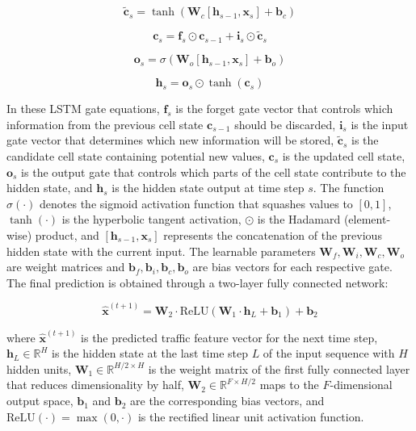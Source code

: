 \documentclass[journal]{IEEEtran}
\begin{document}
\begin{equation}
\tilde{\mathbf{c}}_s = \tanh(\mathbf{W}_c [\mathbf{h}_{s-1}, \mathbf{x}_s] + \mathbf{b}_c)
\label{eq:candidate}
\end{equation}

\begin{equation}
\mathbf{c}_s = \mathbf{f}_s \odot \mathbf{c}_{s-1} + \mathbf{i}_s \odot \tilde{\mathbf{c}}_s
\label{eq:cell_state}
\end{equation}

\begin{equation}
\mathbf{o}_s = \sigma(\mathbf{W}_o [\mathbf{h}_{s-1}, \mathbf{x}_s] + \mathbf{b}_o)
\label{eq:output_gate}
\end{equation}

\begin{equation}
\mathbf{h}_s = \mathbf{o}_s \odot \tanh(\mathbf{c}_s)
\label{eq:hidden_state}
\end{equation}

\noindent In these LSTM gate equations, $\mathbf{f}_s$ is the forget gate vector that controls which information from the previous cell state $\mathbf{c}_{s-1}$ should be discarded, $\mathbf{i}_s$ is the input gate vector that determines which new information will be stored, $\tilde{\mathbf{c}}_s$ is the candidate cell state containing potential new values, $\mathbf{c}_s$ is the updated cell state, $\mathbf{o}_s$ is the output gate that controls which parts of the cell state contribute to the hidden state, and $\mathbf{h}_s$ is the hidden state output at time step $s$. The function $\sigma(\cdot)$ denotes the sigmoid activation function that squashes values to $[0,1]$, $\tanh(\cdot)$ is the hyperbolic tangent activation, $\odot$ is the Hadamard (element-wise) product, and $[\mathbf{h}_{s-1}, \mathbf{x}_s]$ represents the concatenation of the previous hidden state with the current input. The learnable parameters $\mathbf{W}_f, \mathbf{W}_i, \mathbf{W}_c, \mathbf{W}_o$ are weight matrices and $\mathbf{b}_f, \mathbf{b}_i, \mathbf{b}_c, \mathbf{b}_o$ are bias vectors for each respective gate. The final prediction is obtained through a two-layer fully connected network:

\begin{equation}
\hat{\mathbf{x}}^{(t+1)} = \mathbf{W}_2 \cdot \text{ReLU}(\mathbf{W}_1 \cdot \mathbf{h}_L + \mathbf{b}_1) + \mathbf{b}_2
\label{eq:prediction}
\end{equation}

\noindent where $\hat{\mathbf{x}}^{(t+1)}$ is the predicted traffic feature vector for the next time step, $\mathbf{h}_L \in \mathbb{R}^H$ is the hidden state at the last time step $L$ of the input sequence with $H$ hidden units, $\mathbf{W}_1 \in \mathbb{R}^{H/2 \times H}$ is the weight matrix of the first fully connected layer that reduces dimensionality by half, $\mathbf{W}_2 \in \mathbb{R}^{F \times H/2}$ maps to the $F$-dimensional output space, $\mathbf{b}_1$ and $\mathbf{b}_2$ are the corresponding bias vectors, and $\text{ReLU}(\cdot) = \max(0, \cdot)$ is the rectified linear unit activation function.
\end{document}
